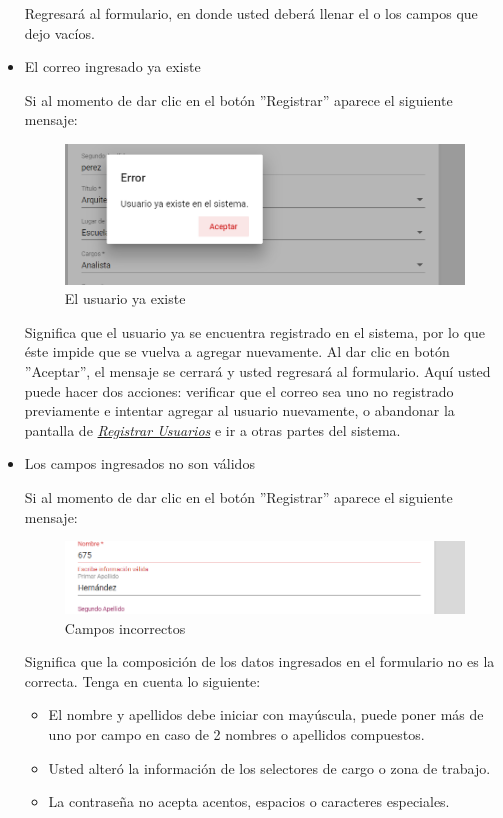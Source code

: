 \begin{itemize}
  	Regresará al formulario, en donde usted deberá llenar el o los campos que dejo vacíos.
  	
  	\item El correo ingresado ya existe
  	
  	Si al momento de dar clic en el botón ''Registrar'' aparece el siguiente mensaje:
  	
  	\begin{figure}[!hbtp]
  		\centering
  		\includegraphics[width=0.4\linewidth]{images/SP5/MSG36}
  		\caption{El usuario ya existe}
  		\label{mensaje36}
  		
  	\end{figure}
  	
  	Significa que el usuario ya se encuentra registrado en el sistema, por lo que éste impide que se vuelva a agregar nuevamente. Al dar clic en botón ''Aceptar'', el mensaje se cerrará y usted  regresará al formulario. Aquí usted puede hacer dos acciones: verificar que el correo sea uno no registrado previamente e intentar agregar al usuario nuevamente, o abandonar la pantalla de \hyperlink{registrarUs}{\textit{Registrar Usuarios}} e ir a otras partes del sistema.
  	\newpage
  	\item Los campos ingresados no son válidos
  	
  	Si al momento de dar clic en el botón ''Registrar'' aparece el siguiente mensaje:
  	\begin{figure}[!hbtp]
  		\centering
  		\includegraphics[width=0.4\linewidth]{images/SP5/MSG35}
  		\caption{Campos incorrectos}
  		\label{mensaje35}
  		
  	\end{figure}
  	
  	Significa que la composición de los datos ingresados en el formulario no es la correcta. Tenga en cuenta lo siguiente:
  	
  	\begin{itemize}
  		\item El nombre y apellidos debe iniciar con mayúscula, puede poner más de uno por campo en caso de 2 nombres o apellidos compuestos.
  		\item Usted alteró la información de los selectores de cargo o zona de trabajo.
  		\item La contraseña no acepta acentos, espacios o caracteres especiales.
  	\end{itemize}
  	
  \end{itemize}
  
